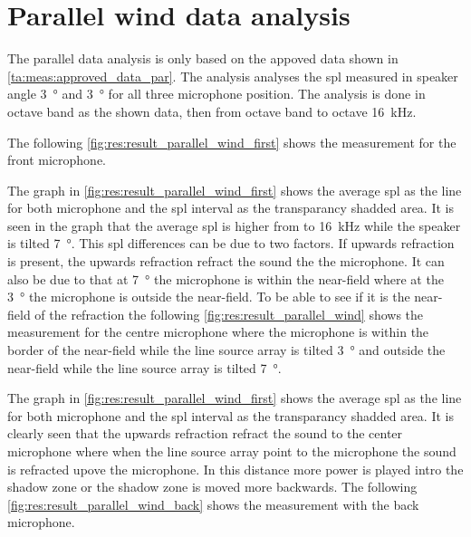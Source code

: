   

\section{Parallel wind data analysis}\label{res:par_data_ana}

The parallel data analysis is only based on the appoved data shown in \autoref{ta:meas:approved_data_par}. The analysis analyses the \gls{spl} measured in speaker angle \SI{3}{\degree} and  \SI{3}{\degree} for all three microphone position. The analysis is done in octave band as the shown data, then from octave band  to octave \SI{16}{\kilo\hertz}. 

 The following \autoref{fig:res:result_parallel_wind_first}  shows the measurement for the front microphone.

  
The graph in \autoref{fig:res:result_parallel_wind_first} shows the average \gls{spl} as the line for both microphone and the \gls{spl} interval as the transparancy shadded area.
It is seen in the graph that the average \gls{spl} is higher from  to \SI{16}{\kilo\hertz} while the speaker is tilted \SI{7}{\degree}. This \gls{spl} differences can be due to two factors. If upwards refraction is present, the upwards refraction refract the sound the the microphone. It can also be due to that at \SI{7}{\degree} the microphone is within the near-field where at the \SI{3}{\degree} the microphone is outside the near-field. To be able to see if it is the near-field of the refraction the following \autoref{fig:res:result_parallel_wind} shows the measurement for the centre microphone where the microphone is within the border of the near-field while the line source array is tilted \SI{3}{\degree} and outside the near-field while the line source array is tilted \SI{7}{\degree}.
 
  
  
 The graph in \autoref{fig:res:result_parallel_wind_first} shows the average \gls{spl} as the line for both microphone and the \gls{spl} interval as the transparancy shadded area. It is clearly seen that the upwards refraction refract the sound to the center microphone where when the line source array point to the microphone the sound is refracted upove the microphone. In this distance more power is played intro the shadow zone or the shadow zone is moved more backwards. The following \autoref{fig:res:result_parallel_wind_back} shows the measurement with the back microphone.
 
